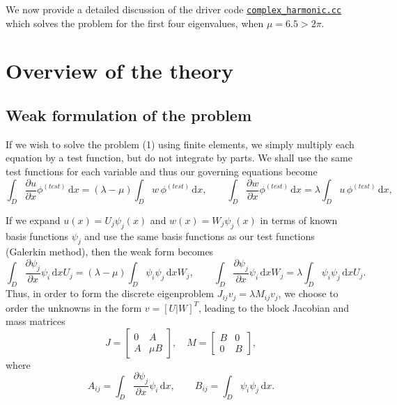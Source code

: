 We now provide a detailed discussion of the driver code \href{../../../../demo_drivers/eigenproblems/harmonic/complex_harmonic.cc}{\tt complex\+\_\+harmonic.\+cc} which solves the problem for the first four eigenvalues, when $ \mu = 6.5 > 2\pi. $



 

\hypertarget{index_theory}{}\section{Overview of the theory}\label{index_theory}
\hypertarget{index_weak}{}\subsection{Weak formulation of the problem}\label{index_weak}
If we wish to solve the problem (1) using finite elements, we simply multiply each equation by a test function, but do not integrate by parts. We shall use the same test functions for each variable and thus our governing equations become \[ \int_{D} \frac{\partial u}{\partial x} \phi^{(test)} \,\mbox{d} x = (\lambda -\mu) \int_{D} w\, \phi^{(test)}\,\mbox{d} x, \quad\quad \int_{D} \frac{\partial w}{\partial x} \phi^{(test)} \,\mbox{d} x = \lambda \int_{D} u\, \phi^{(test)}\,\mbox{d} x, \quad \]

If we expand $ u(x) = U_{j} \psi_{j}(x) $ and $ w(x) = W_{j} \psi_{j}(x) $ in terms of known basis functions $ \psi_{j} $ and use the same basis functions as our test functions (Galerkin method), then the weak form becomes \[ \int_{D} \frac{\partial \psi_{j}}{\partial x} \psi_{i} \,\mbox{d} x U_{j} = (\lambda - \mu) \int_{D} \psi_{i} \psi_{j}\,\mbox{d} x W_{j},\quad\quad \int_{D} \frac{\partial \psi_{j}}{\partial x} \psi_{i} \,\mbox{d} x W_{j} = \lambda \int_{D} \psi_{i} \psi_{j}\,\mbox{d} x U_{j}. \] Thus, in order to form the discrete eigenproblem $ J_{ij} v_{j} = \lambda M_{ij} v_{j} $, we choose to order the unknowns in the form $ v = [ U | W ]^{T} $, leading to the block Jacobian and mass matrices \[ J = \left[\begin{array}{c|c} 0 & A \\\hline A & \mu B \end{array}\right],\quad M = \left[\begin{array}{c|c} B & 0 \\\hline 0 & B \end{array}\right], \] where \[ A_{ij} = \int_{D} \frac{\partial \psi_{j}}{\partial x} \psi_{i} \,\mbox{d} x , \quad\quad B_{ij} = \int_{D} \psi_{i} \psi_{j}\,\mbox{d} x. \]



